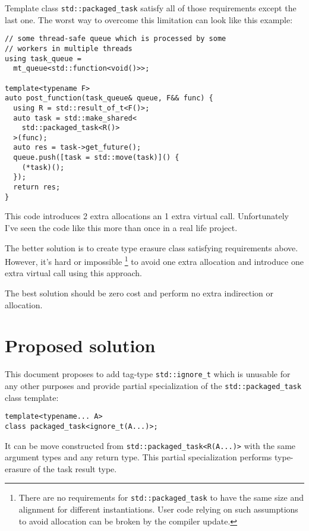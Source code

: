 \documentclass[ebook,openany,10pt,oneside,final]{memoir}
\begin{document}
Template class \mbox{\texttt{std::packaged_task}} satisfy all of those requirements
except the last one. The worst way to overcome this limitation can look like
this example:

\begin{lstlisting}
// some thread-safe queue which is processed by some
// workers in multiple threads
using task_queue =
  mt_queue<std::function<void()>>;

template<typename F>
auto post_function(task_queue& queue, F&& func) {
  using R = std::result_of_t<F()>;
  auto task = std::make_shared<
    std::packaged_task<R()>
  >(func);
  auto res = task->get_future();
  queue.push([task = std::move(task)]() {
    (*task)();
  });
  return res;
}
\end{lstlisting}

This code introduces 2 extra allocations an 1 extra virtual call. Unfortunately
I've seen the code like this more than once in a real life project.

The better solution is to create type erasure class satisfying requirements
above. However, it's hard or impossible \footnote{There are no requirements for
\mbox{\texttt{std::packaged_task}} to have the same size and alignment for different
instantiations. User code relying on such assumptions to avoid allocation can
be broken by the compiler update.} to avoid one extra allocation and introduce one
extra virtual call using this approach.

The best solution should be zero cost and perform no extra indirection or
allocation.

\section{Proposed solution}

This document proposes to add tag-type \mbox{\texttt{std::ignore_t}} which is unusable
for any other
purposes and provide partial specialization of the \mbox{\texttt{std::packaged_task}}
class template:

\begin{lstlisting}
template<typename... A>
class packaged_task<ignore_t(A...)>;
\end{lstlisting}

It can be move constructed from \mbox{\texttt{std::packaged_task\textless R(A...)\textgreater}}
with the same argument types and any return type. This partial specialization performs
type-erasure of the task result type.
\end{document}

